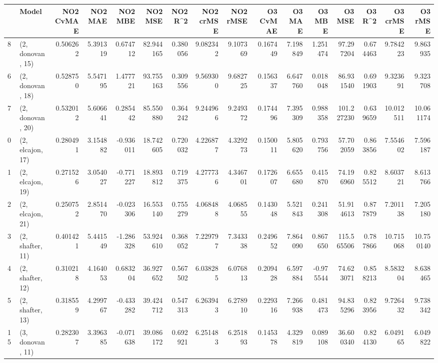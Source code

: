\begin{tabular}{llrrrrrrrrrrrrrr}
\toprule
{} &             Model &  NO2 CvMAE &   NO2 MAE &   NO2 MBE &    NO2 MSE &   NO2 R\textasciicircum2 &  NO2 crMSE &  NO2 rMSE &  O3 CvMAE &    O3 MAE &    O3 MBE &      O3 MSE &    O3 R\textasciicircum2 &   O3 crMSE &    O3 rMSE \\
\midrule
8  &  (2, donovan, 15) &   0.506262 &  5.391319 &  0.674712 &  82.944165 &  0.380056 &   9.082342 &  9.107369 &  0.167449 &  7.198849 &  1.251474 &   97.297204 &  0.674463 &   9.784223 &   9.863935 \\
6  &  (2, donovan, 18) &   0.528750 &  5.547195 &  1.477721 &  93.755163 &  0.309556 &   9.569300 &  9.682725 &  0.156337 &  6.647760 &  0.018048 &   86.931540 &  0.691903 &   9.323691 &   9.323708 \\
7  &  (2, donovan, 20) &   0.532012 &  5.606641 &  0.285442 &  85.550880 &  0.364242 &   9.244966 &  9.249372 &  0.174496 &  7.395309 &  0.988358 &  101.227230 &  0.639659 &  10.012511 &  10.061174 \\
0  &  (2, elcajon, 17) &   0.280491 &  3.154882 & -0.936011 &  18.742605 &  0.720032 &   4.226877 &  4.329273 &  0.150011 &  5.805620 &  0.793756 &   57.702059 &  0.863856 &   7.554602 &   7.596187 \\
1  &  (2, elcajon, 19) &   0.271526 &  3.054027 & -0.771227 &  18.893812 &  0.719375 &   4.277736 &  4.346701 &  0.172607 &  6.655680 &  0.415870 &   74.196960 &  0.825512 &   8.603721 &   8.613766 \\
2  &  (2, elcajon, 21) &   0.250752 &  2.851470 & -0.023306 &  16.553140 &  0.755279 &   4.068488 &  4.068555 &  0.143048 &  5.521843 &  0.241308 &   51.914613 &  0.877879 &   7.201138 &   7.205180 \\
3  &  (2, shafter, 11) &   0.401421 &  5.441549 & -1.286328 &  53.924610 &  0.368052 &   7.229797 &  7.343338 &  0.249652 &  7.864090 &  0.867650 &  115.565506 &  0.787866 &  10.715068 &  10.750140 \\
4  &  (2, shafter, 12) &   0.310218 &  4.164053 &  0.683204 &  36.927652 &  0.567502 &   6.038285 &  6.076813 &  0.209428 &  6.597884 & -0.975544 &   74.623071 &  0.858213 &   8.583204 &   8.638465 \\
5  &  (2, shafter, 13) &   0.318559 &  4.299767 & -0.433282 &  39.424712 &  0.547313 &   6.263943 &  6.278910 &  0.229316 &  7.266938 &  0.481473 &   94.835296 &  0.823956 &   9.726432 &   9.738342 \\
15 &  (3, donovan, 11) &   0.282307 &  3.396385 & -0.071638 &  39.086172 &  0.692921 &   6.251483 &  6.251893 &  0.145378 &  4.329819 &  0.089108 &   36.600340 &  0.824130 &   6.049165 &   6.049822 \\

\end{tabular}
